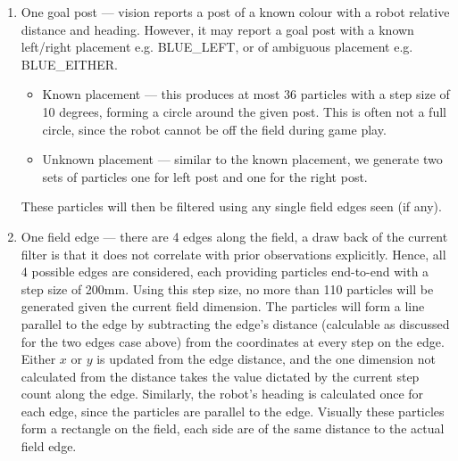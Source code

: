 \documentclass[pdftex,11pt,a4paper]{report}
\begin{document}
\begin{enumerate}
  \item One goal post --- vision reports a post of a known colour with a robot relative distance and heading. However, it may report a goal post with a known left/right placement e.g. BLUE\_LEFT, or of ambiguous placement e.g. BLUE\_EITHER.
    \begin{itemize}
      \item Known placement --- this produces at most 36 particles with a step size of 10 degrees, forming a circle around the given post. This is often not a full circle, since the robot cannot be off the field during game play.
      \item Unknown placement --- similar to the known placement, we generate two sets of particles one for left post and one for the right post.
    \end{itemize}
    These particles will then be filtered using any single field edges seen (if any).
  \item One field edge --- there are 4 edges along the field, a draw back of the current filter is that it does not correlate with prior observations explicitly. Hence, all 4 possible edges are considered, each providing particles end-to-end with a step size of 200mm. Using this step size, no more than 110 particles will be generated given the current field dimension. The particles will form a line parallel to the edge by subtracting the edge's distance (calculable as discussed for the two edges case above) from the coordinates at every step on the edge. Either $x$ or $y$ is updated from the edge distance, and the one dimension not calculated from the distance takes the value dictated by the current step count along the edge. Similarly, the robot's heading is calculated once for each edge, since the particles are parallel to the edge. Visually these particles form a rectangle on the field, each side are of the same distance to the actual field edge.
\end{enumerate}
\end{document}
